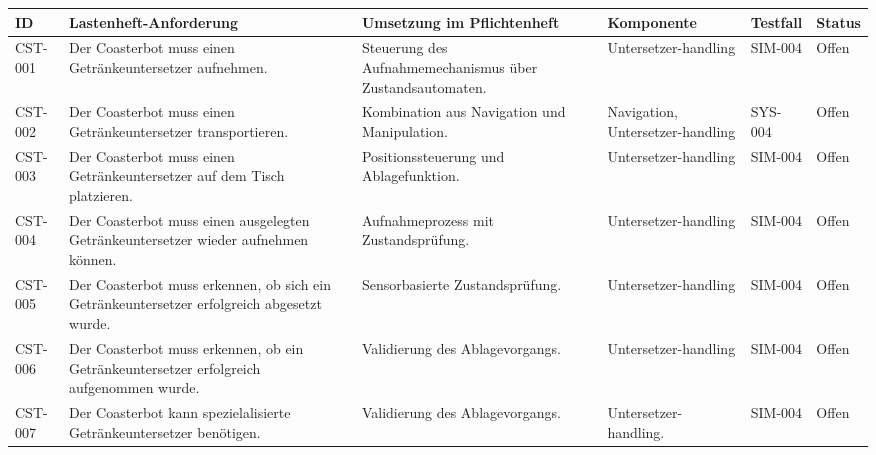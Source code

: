 \begin{longtable}[]{@{}
  >{\raggedright\arraybackslash}p{}
  >{\raggedright\arraybackslash}p{}
  >{\raggedright\arraybackslash}p{}
  >{\raggedright\arraybackslash}p{}
  >{\raggedleft\arraybackslash}p{}
  >{\raggedright\arraybackslash}p{}@{}}
\toprule\noalign{}
\begin{minipage}[b]{\linewidth}\raggedright
ID
\end{minipage} & \begin{minipage}[b]{\linewidth}\raggedright
Lastenheft-Anforderung
\end{minipage} & \begin{minipage}[b]{\linewidth}\raggedright
Umsetzung im Pflichtenheft
\end{minipage} & \begin{minipage}[b]{\linewidth}\raggedright
Komponente
\end{minipage} & \begin{minipage}[b]{\linewidth}\raggedleft
Testfall
\end{minipage} & \begin{minipage}[b]{\linewidth}\raggedright
Status
\end{minipage} \\
\midrule\noalign{}
\endhead
\bottomrule\noalign{}
\endlastfoot
CST-001 & Der Coasterbot muss einen Getränkeuntersetzer aufnehmen. &
Steuerung des Aufnahmemechanismus über Zustandsautomaten. &
Untersetzer-handling & SIM-004 & Offen \\
CST-002 & Der Coasterbot muss einen Getränkeuntersetzer transportieren.
& Kombination aus Navigation und Manipulation. & Navigation,
Untersetzer-handling & SYS-004 & Offen \\
CST-003 & Der Coasterbot muss einen Getränkeuntersetzer auf dem Tisch
platzieren. & Positionssteuerung und Ablagefunktion. &
Untersetzer-handling & SIM-004 & Offen \\
CST-004 & Der Coasterbot muss einen ausgelegten Getränkeuntersetzer
wieder aufnehmen können. & Aufnahmeprozess mit Zustandsprüfung. &
Untersetzer-handling & SIM-004 & Offen \\
CST-005 & Der Coasterbot muss erkennen, ob sich ein Getränkeuntersetzer
erfolgreich abgesetzt wurde. & Sensorbasierte Zustandsprüfung. &
Untersetzer-handling & SIM-004 & Offen \\
CST-006 & Der Coasterbot muss erkennen, ob ein Getränkeuntersetzer
erfolgreich aufgenommen wurde. & Validierung des Ablagevorgangs. &
Untersetzer-handling & SIM-004 & Offen \\
CST-007 & Der Coasterbot kann spezielalisierte Getränkeuntersetzer
benötigen. & Validierung des Ablagevorgangs. & Untersetzer-handling. &
SIM-004 & Offen \\
\end{longtable}

